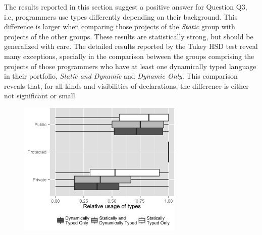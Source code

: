 \documentclass[msc]{ppgccufmg}
\renewcommand{\arraystretch}{1.2}
\begin{document}
The results reported in this section suggest a positive answer for Question Q3, i.e, programmers use types differently depending on their background.
This difference is larger when comparing those projects of the \emph{Static} group with projects of the other groups.
These results are statistically strong,  but should be generalized with care.
The detailed results reported by the Tukey HSD test reveal many exceptions, specially in the comparison between the groups comprising the projects of those programmers who have at least one dynamically typed language in their portfolio, \emph{Static and Dynamic} and \emph{Dynamic Only}.
This comparison reveals that, for all kinds and visibilities of declarations, the difference is either not significant or small.


\begin{figure}[ht]
\centering 
\includegraphics[width=0.7\textwidth]{../aosd_2014/analysis/result/background/comparison/boxplots/23_declarations_by_visibility.png} 
\vspace{0.1cm}
\renewcommand{\arraystretch}{1.2}



\end{figure}
\end{document}
